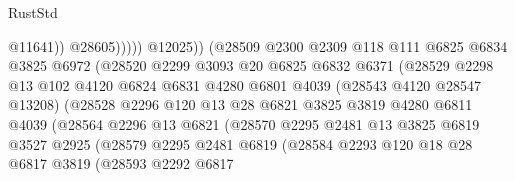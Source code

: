 \begin{lexlean}{RustStd}
\begin{coremodule}
                                          @11641))
                                      @28605)))))
                            @12025))
                        (@28509
                          @2300
                          @2309
                          @118
                          @111
                          @6825
                          @6834
                          @3825
                          @6972
                          (@28520
                            @2299
                            @3093
                            @20
                            @6825
                            @6832
                            @6371
                            (@28529
                              @2298
                              @13
                              @102
                              @4120
                              @6824
                              @6831
                              @4280
                              @6801
                              @4039
                              (@28543 @4120 @28547 @13208)
                              (@28528
                                @2296
                                @120
                                @13
                                @28
                                @6821
                                @3825
                                @3819
                                @4280
                                @6811
                                @4039
                                (@28564
                                  @2296
                                  @13
                                  @6821
                                  (@28570
                                    @2295
                                    @2481
                                    @13
                                    @3825
                                    @6819
                                    @3527
                                    @2925
                                    (@28579
                                      @2295
                                      @2481
                                      @6819
                                      (@28584
                                        @2293
                                        @120
                                        @18
                                        @28
                                        @6817
                                        @3819
                                        (@28593
                                          @2292
                                          @6817

\end{coremodule}
\end{lexlean}
